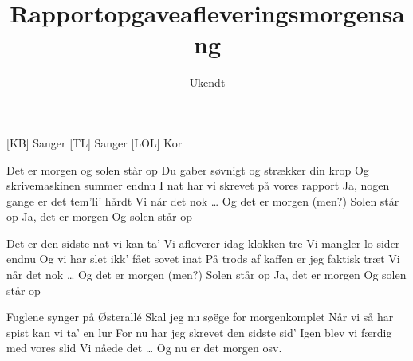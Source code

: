 \documentclass[a4paper,11pt]{article}
\title{Rapportopgaveafleveringsmorgensang}
\author{Ukendt}
\begin{document}
\maketitle

\begin{roles}
[KB] Sanger
[TL] Sanger
[LOL] Kor
\end{roles}

\begin{song}

 Det er morgen og solen står op
  Du gaber søvnigt og strækker din krop
  Og skrivemaskinen summer endnu
  I nat har vi skrevet på vores rapport
  Ja, nogen gange er det tem'li' hårdt
  Vi når det nok \ldots
  Og det er morgen (men?)
  Solen står op
  Ja, det er morgen
  Og solen står op

 Det er den sidste nat vi kan ta'
  Vi afleverer idag klokken tre
  Vi mangler lo sider endnu
  Og vi har slet ikk' fået sovet inat
  På trods af kaffen er jeg faktisk træt
  Vi når det nok \ldots
  Og det er morgen (men?)
  Solen står op
  Ja, det er morgen
  Og solen står op

 Fuglene synger på Østerallé
  Skal jeg nu søëge for morgenkomplet
  Når vi så har spist kan vi ta' en lur
  For nu har jeg skrevet den sidste sid'
  Igen blev vi færdig med vores slid
  Vi nåede det \ldots
  Og nu er det morgen
  osv.

\end{song}
\end{document}
